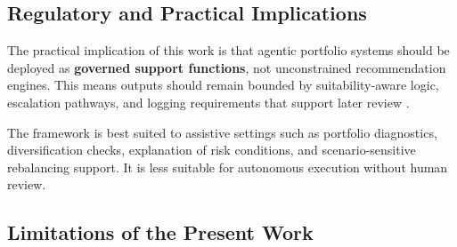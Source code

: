 \documentclass[11pt]{article}
\begin{document}
\subsection{Regulatory and Practical Implications}

The practical implication of this work is that agentic portfolio systems should be deployed as \textbf{governed support functions}, not unconstrained recommendation engines. This means outputs should remain bounded by suitability-aware logic, escalation pathways, and logging requirements that support later review \cite{mifid2014,gdpr2016,basel2011,aiact2024}.

The framework is best suited to assistive settings such as portfolio diagnostics, diversification checks, explanation of risk conditions, and scenario-sensitive rebalancing support. It is less suitable for autonomous execution without human review.

\subsection{Limitations of the Present Work}
\end{document}
